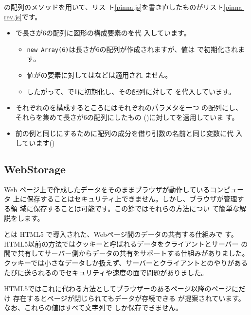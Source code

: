\JS の配列のメソッドを用いて、\JS リス
ト\ref{pinna.js}を書き直したものが\JS リスト\ref{pinna-rev.js}です。

\begin{itemize}
 \item {}で長さが6の配列に図形の構成要素のを代
			 入しています。
			 \begin{itemize}
				\item \Verb+new Array(6)+は長さが6の配列が作成されますが、値は
							で初期化されます。
				\item 値がの要素に対してはなどは適用され
							ません。
				\item したがって、で1に初期化し、その配列に対して
							を代入しています。
			 \end{itemize}
 \item それぞれのを構成するところにはそれぞれのパラメタを一つ
			 の配列にし、それらを集めて長さが6の配列にしたもの
			 ()に対してを適用していま
			 す。
 \item 前の例と同じにするために配列の成分を借り引数の名前と同じ変数に代
			 入しています()
\end{itemize}
\subsection{WebStorage}
Web ページ上で作成したデータをそのままブラウザが動作しているコンピュータ
上に保存することはセキュリティ上できません。しかし、ブラウザが管理する領
域に保存することは可能です。この節ではそれらの方法につい
て簡単な解説をします。

とは HTML5 で導入された、Webページ間のデータの共有する仕組みで
す。HTML5以前の方法ではクッキーと呼ばれるデータをクライアントとサーバー
の間で共有してサーバー側からデータの共有をサポートする仕組みがありました。
クッキーでは小さなデータしか扱えず、サーバーとクライアントとのやりがある
たびに送られるのでセキュリティや速度の面で問題がありました。

HTML5ではこれに代わる方法としてブラウザーのあるページ以降のページにだけ
存在するとページが閉じられてもデータが存続できる
が提案されています。なお、これらの値はすべて文字列で
しか保存できません。

